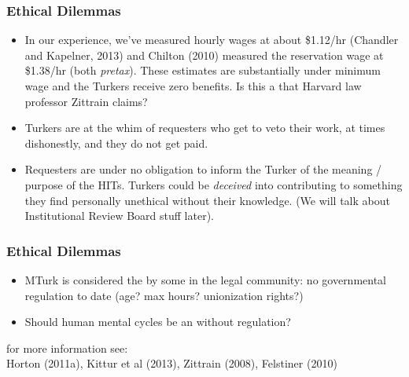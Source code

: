 \documentclass[slides]{beamer} %
\begin{document}
\begin{frame}\frametitle{Ethical Dilemmas}

\begin{itemize}
\item In our experience, we've measured hourly wages at about \$1.12/hr (Chandler and Kapelner, 2013) and Chilton (2010) measured the reservation wage at \$1.38/hr (both \textit{pretax}).  \pause These estimates are substantially under minimum wage and the Turkers receive zero benefits.  \pause Is this a  that Harvard law professor Zittrain claims? \pause
\item Turkers are at the whim of requesters who get to veto their work, at times dishonestly, and they do not get paid. \pause
\item Requesters are under no obligation to inform the Turker of the meaning / purpose of the HITs. Turkers could be \textit{deceived} into contributing to something they find personally unethical without their knowledge. (We will talk about Institutional Review Board stuff later).
\end{itemize}

\end{frame}

\begin{frame}\frametitle{Ethical Dilemmas}
\pause

\begin{itemize}
\item MTurk is considered the  by some in the legal community: no governmental regulation to date (age? max hours? unionization rights?) \pause
\item Should human mental cycles be an  without regulation? \pause
\end{itemize}

\centering
\scriptsize
for more information see: \\
Horton (2011a), Kittur et al (2013), Zittrain (2008), Felstiner (2010)


\end{frame}
\end{document}
